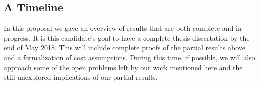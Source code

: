 \subsection{A Timeline}
In this proposal we gave an overview of results that are both complete and in progress.
It is this candidate's goal to have a complete thesis dissertation by the end of May 2018.
This will include complete proofs of the partial results above and a formalization of cost assumptions.
During this time, if possible, we will also approach some of the open problems left by our work mentioned here and
the still unexplored implications of our partial results.

